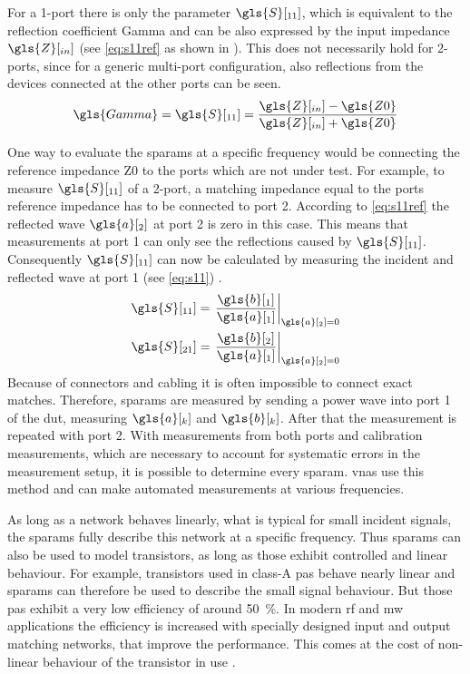 \documentclass[12pt,a4paper,parskip=full,abstract=true,BCOR=12mm]{scrreprt}
\begin{document}
For a 1-port there is only the parameter $\gls{S}[_{11}]$, which is equivalent to the reflection
coefficient \gls{Gamma} and can be also expressed by the input impedance $\gls{Z}[_{in}]$ (see
\cref{eq:s11ref} as shown in \cite{pozar_mw_engineering_2011}). This does not necessarily hold for 2-ports, since for a generic
multi-port configuration, also reflections from the devices connected at the other ports
can be seen.
\begin{equation}
    \label{eq:s11ref} \gls{Gamma} = \gls{S}[_{11}] = \frac{\gls{Z}[_{in}]-\gls{Z0}}{\gls{Z}[_{in}]+\gls{Z0}}
\end{equation}

One way to evaluate the \glspl{sparam} at a specific frequency would be connecting
the reference impedance \gls{Z0} to the ports which are not under test. For example, to measure $\gls{S}[_{11}]$ of a 2-port, a matching impedance equal to the ports reference impedance has to
be connected to port 2. According to \cref{eq:s11ref} the reflected wave $\gls{a}[_2]$
at port 2 is zero in this case. This means that measurements at port 1 can only see the
reflections caused by $\gls{S}[_{11}]$. Consequently $\gls{S}[_{11}]$ can now be calculated by measuring the incident
and reflected wave at port 1 (see \cref{eq:s11}) \cite{agilent_an_154}.
\begin{align}
    \label{eq:s11} \gls{S}[_{11}] & = \left.\frac{\gls{b}[_1]}{\gls{a}[_1]} \right\rvert_{\gls{a}[_2] = 0}\\
    \label{eq:s21} \gls{S}[_{21}] & = \left.\frac{\gls{b}[_2]}{\gls{a}[_1]} \right\rvert_{\gls{a}[_2] = 0}
\end{align}
Because of connectors and cabling it is often impossible to connect exact matches. Therefore,
\glspl{sparam} are measured by sending a power wave into port 1 of the \gls{dut}, measuring
$\gls{a}[_k]$ and $\gls{b}[_k]$. After that the measurement is repeated with port 2. With measurements from
both ports and calibration measurements, which are necessary to account for systematic errors in the measurement setup,
it is possible to determine every \gls{sparam}. \Glspl{vna} use this method
and can make automated measurements at various frequencies.

As long as a network behaves linearly, what is typical for small incident signals, the \glspl{sparam}
fully describe this network at a specific frequency. Thus \glspl{sparam} can also be used
to model transistors, as long as those exhibit controlled and linear behaviour. For example,
transistors used in class-A \glspl{pa} behave nearly linear and \glspl{sparam} can therefore be used to describe the small
signal behaviour. But those \glspl{pa} exhibit a very low efficiency of around \SI{50}{\percent}.
In modern \gls{rf} and \gls{mw} applications the efficiency is increased with specially designed input and
output matching networks, that improve the performance. This comes at the cost of non-linear
behaviour of the transistor in use \cite{ghannouchi_load-pull_2013}.
\end{document}
